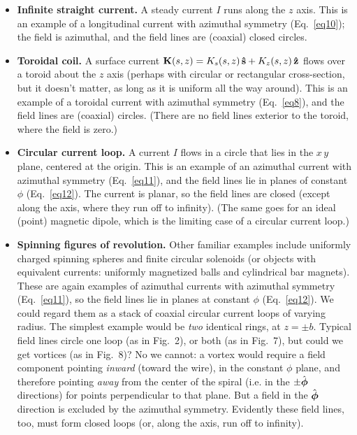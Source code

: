 \documentclass[aps,prb,twocolumn,groupedaddress,noshowpacs,checklength,amsmath]{revtex4-1}
\def\zhat{{\bf \hat z}}
\def\phat{{\hat{\mbox{\boldmath$\phi$}}}}
\def\shat{{\bf \hat s}}
\begin{document}
\begin{itemize}
\item {\bf Infinite straight current.}  A steady current $I$ runs along the $z$ axis.  This is an example of a longitudinal current with azimuthal symmetry (Eq.~\ref{eq10}); the field is azimuthal, and the field lines are (coaxial) closed circles.
\item {\bf Toroidal coil.}  A surface current ${\bf K}(s,z) = K_s(s,z)\,\shat + K_z(s,z)\,\zhat$ flows over a toroid about the $z$ axis (perhaps with circular or rectangular cross-section, but it doesn't matter, as long as it is uniform all the way around).  This is an example of a toroidal current with azimuthal symmetry (Eq.~\ref{eq8}), and the field lines are (coaxial) circles.  (There are no field lines exterior to the toroid, where the field is zero.)
\item {\bf Circular current loop.}  A current $I$ flows in a circle that lies in the $x\,y$ plane, centered at the origin.  This is an example of an azimuthal current with azimuthal symmetry (Eq.~\ref{eq11}), and the field lines lie in planes of constant $\phi$ (Eq.~\ref{eq12}).  The current is planar, so the field lines are closed (except along the axis, where they run off to infinity).  (The same goes for an ideal (point) magnetic dipole, which is the limiting case of a circular current loop.)
\item {\bf Spinning figures of revolution.} Other familiar examples include uniformly charged spinning spheres and finite circular solenoids (or objects with equivalent currents: uniformly magnetized balls and cylindrical bar magnets).  These are again examples of azimuthal currents with azimuthal symmetry (Eq.~\ref{eq11}), so the field lines lie in planes at constant $\phi$ (Eq.~\ref{eq12}).  We could regard them as a stack of coaxial circular current loops of varying radius.  The simplest example would be {\it two} identical rings, at $z=\pm b$.  Typical field lines circle one loop (as in Fig.~2), or both (as in Fig.~7), but could we get vortices (as in Fig.~8)?  No we cannot: a vortex would require a field component pointing {\it inward} (toward the wire), in the constant $\phi$ plane, and therefore pointing {\it away} from the center of the spiral (i.e. in the $\pm \phat$ directions) for points perpendicular to that plane.  But a field in the $\phat$ direction is excluded by the azimuthal symmetry.  Evidently these field lines, too, must form closed loops (or, along the axis, run off to infinity).\cite{ROTI} 
\end{itemize}
\end{document}
